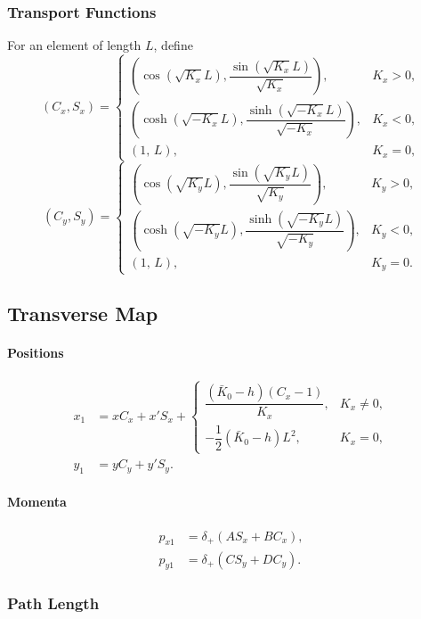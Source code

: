 \subsubsection*{Transport Functions}

For an element of length $L$, define
\[
(C_x,S_x)=
\begin{cases}
\left(\cos(\sqrt{K_x}L), \dfrac{\sin(\sqrt{K_x}L)}{\sqrt{K_x}}\right),
& K_x>0, \\[1em]
\left(\cosh(\sqrt{-K_x}L), \dfrac{\sinh(\sqrt{-K_x}L)}{\sqrt{-K_x}}\right),
& K_x<0, \\[1em]
(1,\,L), & K_x=0,
\end{cases}
\]
\[
(C_y,S_y)=
\begin{cases}
\left(\cos(\sqrt{K_y}L), \dfrac{\sin(\sqrt{K_y}L)}{\sqrt{K_y}}\right),
& K_y>0, \\[1em]
\left(\cosh(\sqrt{-K_y}L), \dfrac{\sinh(\sqrt{-K_y}L)}{\sqrt{-K_y}}\right),
& K_y<0, \\[1em]
(1,\,L), & K_y=0.
\end{cases}
\]

\subsection*{Transverse Map}

\paragraph{Positions}
\begin{align}
x_1 &= x C_x + x' S_x
+ \begin{cases}
\dfrac{(\bar{K}_0-h)(C_x-1)}{K_x}, & K_x\neq 0, \\[1em]
-\dfrac{1}{2}(\bar{K}_0-h)L^2, & K_x=0,
\end{cases}
\\
y_1 &= y C_y + y' S_y .
\end{align}

\paragraph{Momenta}
\begin{align}
p_{x1} &= \delta_+ \left(A S_x + B C_x\right), \\
p_{y1} &= \delta_+ \left(C S_y + D C_y\right).
\end{align}

\subsubsection*{Path Length}

